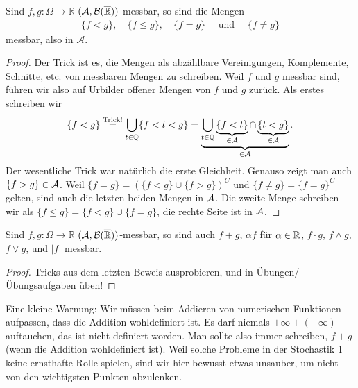 \begin{lemma}
	Sind $f,g \! : \Omega \rightarrow \overline{\mathbb{R}}$ $(\mathcal{A}, \mathcal{B}(\overline{\mathbb{R}}))$-messbar, so sind die Mengen 
\begin{align*}
	\{ f < g \},\quad \{ f \leq g \}, \quad \{ f = g \}\quad\text{ und }\quad \{ f \neq g \}
\end{align*}	
	messbar, also in $\mathcal A$.
\end{lemma}

\begin{proof}
Der Trick ist es, die Mengen als abz\"ahlbare Vereinigungen, Komplemente, Schnitte, etc. von messbaren Mengen zu schreiben. Weil $f$ und $g$ messbar sind, f\"uhren wir also auf Urbilder offener Mengen von $f$ und $g$ zur\"uck. Als erstes schreiben wir 
 \begin{gather*}
		\{ f < g \} \overset{\text{Trick!}}{=} \bigcup\limits_{t \in \mathbb{Q}} \{ f < t < g \} =\underbrace{\bigcup\limits_{t \in \mathbb{Q}} \underbrace{\{ f < t \}}_{\in \mathcal{A}} \cap \underbrace{\{ t < g \}}_{\in \mathcal{A}}}_{\in \mathcal{A}}.
\end{gather*}	
Der wesentliche Trick war nat\"urlich die erste Gleichheit. Genauso zeigt man auch $\{ f > g \} \in \mathcal{A}$. Weil $\{ f = g \} = (\{ f < g \} \cup \{ f>g \})^C$ und $\{ f \neq g \} = \{ f = g \}^C$ gelten, sind auch die letzten beiden Mengen in $\mathcal{A}$. Die zweite Menge schreiben wir als $\{f\leq g\}=\{f<g\}\cup \{f=g\}$, die rechte Seite ist in $\mathcal{A}$.
\end{proof}

\begin{lemma}\label{hilf}
	Sind $f,g \! : \Omega \rightarrow \overline{\mathbb{R}}$ $(\mathcal{A}, \mathcal{B}(\overline{\mathbb{R}}))$-messbar, so sind auch $f+g$, $\alpha f$ f\"ur $\alpha\in \mathbb{R}$, $f \cdot g$, $f \land g$, $f \lor g$, und $|f|$ messbar.
\end{lemma}
\begin{proof}
	Tricks aus dem letzten Beweis ausprobieren, und in \"Ubungen/\"Ubungsaufgaben \"uben!
\end{proof}
Eine kleine Warnung: Wir m\"ussen beim Addieren von numerischen Funktionen aufpassen, dass die Addition wohldefiniert ist. Es darf niemals $+\infty+(-\infty)$ auftauchen, das ist nicht definiert worden. Man sollte also immer schreiben, \glqq$f+g$ (wenn die Addition wohldefiniert ist)\grqq. Weil solche Probleme in der Stochastik 1 keine ernsthafte Rolle spielen, sind wir hier bewusst etwas unsauber, um nicht von den wichtigsten Punkten abzulenken.\smallskip


